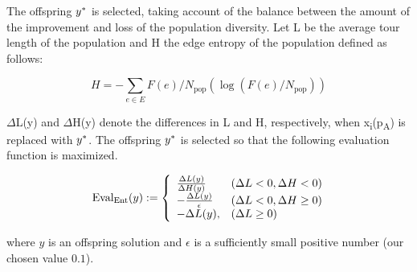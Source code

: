 The offspring $y\ssymbol{1}$ is selected, taking account of the balance between the amount of the improvement and loss of the population diversity. Let L be the average tour length of the population and H the edge entropy of the population defined as follows:

\begin{equation}
H=-\sum_{e \in E} F(e) / N_{\mathrm{pop}}\left(\log \left(F(e) / N_{\mathrm{pop}}\right)\right)
\end{equation}

$\Delta$L(y) and $\Delta$H(y) denote the differences in L and H, respectively, when x\textsubscript{i}(p\textsubscript{A}) is replaced with $y\ssymbol{1}$. The offspring $y\ssymbol{1}$ is selected so that the following evaluation function is maximized.

\begin{equation}\text { Eval\textsubscript{Ent}}(y):=\left\{\begin{array}{ll}
\frac{\Delta L(y)}{\Delta H(y)} & (\Delta L<0, \Delta H<0) \\
-\frac{\Delta L(y)}{\epsilon} & (\Delta L<0, \Delta H \geq 0) \\
-\Delta L(y), & (\Delta L \geq 0)
\end{array}\right.\end{equation}

where $y$ is an offspring solution and $\epsilon$ is a sufficiently small positive number (our chosen value $0.1$).\\

